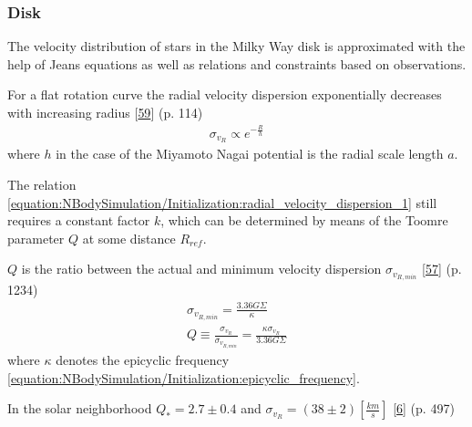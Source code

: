 \documentclass[letterpaper,10pt,english]{sphinxmanual}
\begin{document}
				\subsubsection{Disk}
					\label{\detokenize{NBodySimulation/Initialization:disk}}
					\sphinxAtStartPar
					The velocity distribution of stars in the Milky Way disk is approximated with the help of Jeans equations as well as relations and constraints based on observations.
					
					\sphinxAtStartPar
					For a flat rotation curve the radial velocity dispersion exponentially decreases with increasing radius {[}\hyperlink{cite.NBodySimulation/Appendix:id14}{59}{]} (p. 114)
					\begin{equation}\label{equation:NBodySimulation/Initialization:radial_velocity_dispersion_1}
					\begin{split}\sigma_{v_{R}} \propto e^{-\frac{R}{h}}\end{split}
					\end{equation}
					\sphinxAtStartPar
					where \(h\) in the case of the Miyamoto Nagai potential is the radial scale length \(a\).
					
					\sphinxAtStartPar
					The relation \eqref{equation:NBodySimulation/Initialization:radial_velocity_dispersion_1} still requires a constant factor \(k\), which can be determined by means of the Toomre parameter \(Q\) at some distance \(R_{ref}\).
					
					\sphinxAtStartPar
					\(Q\) is the ratio between the actual and minimum velocity dispersion \(\sigma_{v_{R,min}}\) {[}\hyperlink{cite.NBodySimulation/Appendix:id16}{57}{]} (p. 1234)
					\begin{equation*}
					\begin{split}\sigma_{v_{R,min}} = \frac{3.36G\Sigma}{\kappa} \\
					Q \equiv \frac{\sigma_{v_{R}}}{\sigma_{v_{R,min}}} = \frac{\kappa \sigma_{v_{R}}}{3.36G\Sigma }\end{split}
					\end{equation*}
					\sphinxAtStartPar
					where \(\kappa\) denotes the epicyclic frequency \eqref{equation:NBodySimulation/Initialization:epicyclic_frequency}.
					
					\sphinxAtStartPar
					In the solar neighborhood \(Q_{\ast} = 2.7 \pm 0.4\) and \(\sigma_{v_{R}} = (38 \pm 2) \left [ \frac{km}{s} \right ]\) {[}\hyperlink{cite.NBodySimulation/Appendix:id17}{6}{]} (p. 497)
					
\end{document}
